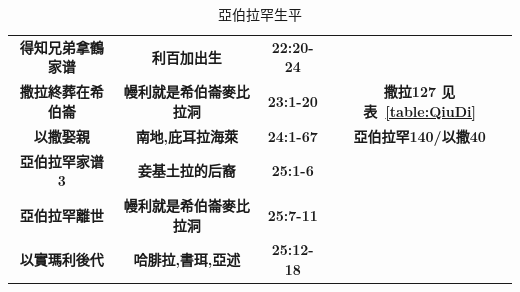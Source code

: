 \begin{table}[H]
\begin{threeparttable}
\begin{tabular}{c c c c}
\multicolumn{1}{L{\dimexpr0.25\linewidth-1\tabcolsep\relax}}{\bfseries 得知兄弟拿鶴家谱} 
& \multicolumn{1}{L{\dimexpr0.2\linewidth-1\tabcolsep\relax}}{\bfseries 利百加出生}  
& \multicolumn{1}{L{\dimexpr0.1\linewidth-1\tabcolsep\relax}}{\bfseries 22:20-24}
& \multicolumn{1}{L{\dimexpr0.2\linewidth-1\tabcolsep\relax}}{\bfseries }\\

\multicolumn{1}{L{\dimexpr0.25\linewidth-1\tabcolsep\relax}}{\bfseries 撒拉終葬在希伯崙}  
& \multicolumn{1}{L{\dimexpr0.25\linewidth-1\tabcolsep\relax}}{\bfseries 幔利就是希伯崙麥比拉洞} 
& \multicolumn{1}{L{\dimexpr0.1\linewidth-1\tabcolsep\relax}}{\bfseries 23:1-20}
& \multicolumn{1}{L{\dimexpr0.22\linewidth-1\tabcolsep\relax}}{\bfseries 撒拉127 见表~\ref{table:QiuDi}}\\

\multicolumn{1}{L{\dimexpr0.25\linewidth-1\tabcolsep\relax}}{\bfseries 以撒娶親} 
& \multicolumn{1}{L{\dimexpr0.25\linewidth-1\tabcolsep\relax}}{\bfseries 南地,庇耳拉海萊}  
& \multicolumn{1}{L{\dimexpr0.1\linewidth-1\tabcolsep\relax}}{\bfseries 24:1-67}
& \multicolumn{1}{L{\dimexpr0.22\linewidth-1\tabcolsep\relax}}{\bfseries 亞伯拉罕140/以撒40}\\

\multicolumn{1}{L{\dimexpr0.25\linewidth-1\tabcolsep\relax}}{\bfseries 亞伯拉罕家谱 3} 
& \multicolumn{1}{L{\dimexpr0.25\linewidth-1\tabcolsep\relax}}{\bfseries 妾基土拉的后裔}  
& \multicolumn{1}{L{\dimexpr0.1\linewidth-1\tabcolsep\relax}}{\bfseries 25:1-6}
& \multicolumn{1}{L{\dimexpr0.2\linewidth-1\tabcolsep\relax}}{\bfseries }\\

\multicolumn{1}{L{\dimexpr0.25\linewidth-1\tabcolsep\relax}}{\bfseries 亞伯拉罕離世}  
& \multicolumn{1}{L{\dimexpr0.25\linewidth-1\tabcolsep\relax}}{\bfseries 幔利就是希伯崙麥比拉洞} 
& \multicolumn{1}{L{\dimexpr0.1\linewidth-1\tabcolsep\relax}}{\bfseries 25:7-11}
& \multicolumn{1}{L{\dimexpr0.2\linewidth-1\tabcolsep\relax}}{\bfseries }\\

\multicolumn{1}{L{\dimexpr0.25\linewidth-1\tabcolsep\relax}}{\bfseries 以實瑪利後代} 
& \multicolumn{1}{L{\dimexpr0.2\linewidth-1\tabcolsep\relax}}{\bfseries 哈腓拉,書珥,亞述}  
& \multicolumn{1}{L{\dimexpr0.1\linewidth-1\tabcolsep\relax}}{\bfseries 25:12-18}
& \multicolumn{1}{L{\dimexpr0.2\linewidth-1\tabcolsep\relax}}{\bfseries }\\\bottomrule
\end{tabular}
\caption{亞伯拉罕生平}
\label{table:YaBoLanShengPing}
\end{threeparttable}
\end{table}

